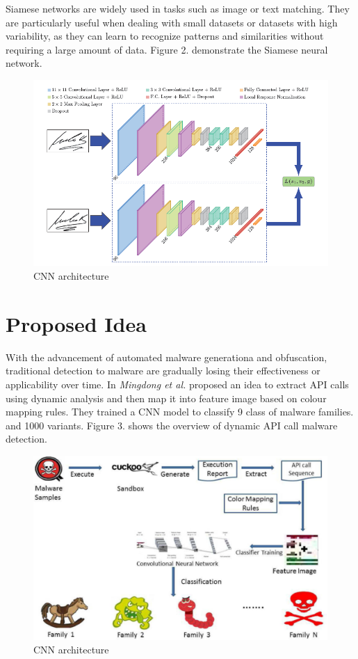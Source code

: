 \documentclass{article}
\begin{document}
Siamese networks are widely used in tasks such as image or text matching.
They are particularly useful when dealing with small datasets or datasets with high variability, 
as they can learn to recognize patterns and similarities without requiring a large amount of data.
Figure 2. demonstrate the Siamese neural network.
\begin{figure}
    \includegraphics[width=\textwidth]{fig/SiameseNN.png}    
    \caption{CNN architecture}
\end{figure}
\section{Proposed Idea}
With the advancement of automated malware generationa and obfuscation, 
traditional detection to malware are gradually losing their effectiveness or applicability over time.
In \cite{ref2} \textit{Mingdong et al.} proposed an idea to extract API calls using dynamic analysis and then 
map it into feature image based on colour mapping rules. They trained a CNN model to classify 9 class of malware families.
and 1000 variants. Figure 3. shows the overview of dynamic API call malware detection.
\begin{figure}
    \includegraphics[width=\textwidth]{fig/overview.png}    
    \caption{CNN architecture}
\end{figure}
\end{document}
